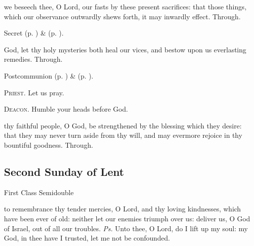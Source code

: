 \secret

\vspace{-0.1\baselineskip}

 we beseech thee, O Lord, our fasts by these present sacrifices: that those things, which our observance outwardly shews forth, it may inwardly effect. Through.
\begin{rubric}
     Secret  (p. \pageref{AshWednesdayMassSecret}) \&   (p. \pageref{SPLivingDeparted}).
\end{rubric}


\postcommunion
{} God, let thy holy mysteries both heal our vices, and bestow upon us everlasting remedies. Through.


\begin{rubric}
     Postcommunion  (p. \pageref{AshWednesdayMassPostcommunion}) \&   (p. \pageref{SPLivingDeparted}).
\end{rubric}

\textsc{Priest.} Let us pray.\par
\textsc{Deacon.} Humble your heads before God.\par
{} thy faithful people, O God, be strengthened by the blessing which they desire: that they may never turn aside from thy will, and may evermore rejoice in thy bountiful goodness. Through.

\subsection{Second Sunday of Lent}
\fancyhead[RE,LO]{}
\begin{inhead}
{First Class Semidouble}
\end{inhead}


\introit
{} to remembrance thy tender mercies, O Lord, and thy loving kindnesses, which have been ever of old: neither let our enemies triumph over us: deliver us, O God of Israel, out of all our troubles. \textit{Ps.} Unto thee, O Lord, do I lift up my soul: my God, in thee have I trusted, let me not be confounded.

